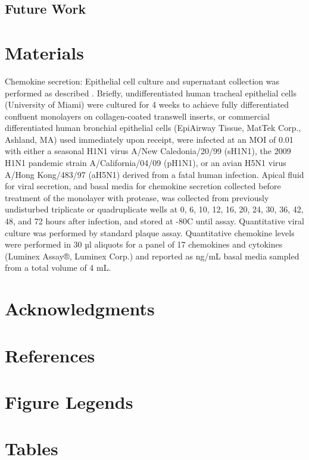 \documentclass[10pt]{article}
\begin{document}
\subsection*{Future Work}



\section*{Materials}

Chemokine secretion:  Epithelial cell culture and supernatant collection was performed as described \cite{Mitchell2011}.  Briefly, undifferentiated human tracheal epithelial cells (University of Miami) were cultured for 4 weeks to achieve fully differentiated confluent monolayers on collagen-coated transwell inserts, or commercial differentiated human bronchial epithelial cells (EpiAirway Tissue, MatTek Corp., Ashland, MA) used immediately upon receipt, were infected at an MOI of 0.01 with either a seasonal H1N1 virus A/New Caledonia/20/99 (sH1N1), the 2009 H1N1 pandemic strain A/California/04/09 (pH1N1), or an avian H5N1 virus A/Hong Kong/483/97 (aH5N1) derived from a fatal human infection.  Apical fluid for viral secretion, and basal media for chemokine secretion collected before treatment of the monolayer with protease, was collected from previously undisturbed triplicate or quadruplicate wells at 0, 6, 10, 12, 16, 20, 24, 30, 36, 42, 48, and 72 hours after infection, and stored at -80C until assay.  Quantitative viral culture was performed by standard plaque assay.  Quantitative chemokine levels were performed in 30 µl aliquots for a panel of 17 chemokines and cytokines (Luminex Assay®, Luminex Corp.) and reported as ng/mL basal media sampled from a total volume of 4 mL.

\section*{Acknowledgments}


\section*{References}


\section*{Figure Legends}


\section*{Tables}
\end{document}
